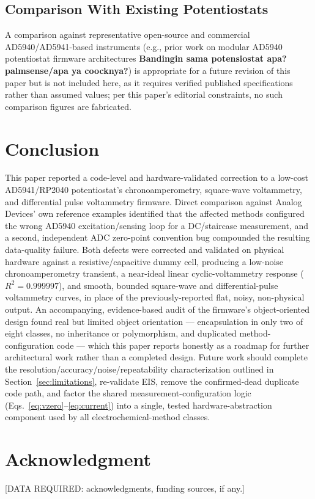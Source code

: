\documentclass[preprint,12pt]{elsarticle}
\begin{document}
\subsection{Comparison With Existing Potentiostats}
A comparison against representative open-source and commercial AD5940/AD5941-based instruments (e.g., prior work on modular AD5940 potentiostat firmware architectures \textbf{Bandingin sama potensiostat apa? palmsense/apa ya coocknya?}) is appropriate for a future revision of this paper but is not included here, as it requires verified published specifications rather than assumed values; per this paper's editorial constraints, no such comparison figures are fabricated.

\section{Conclusion}
This paper reported a code-level and hardware-validated correction to a low-cost AD5941/RP2040 potentiostat's chronoamperometry, square-wave voltammetry, and differential pulse voltammetry firmware. Direct comparison against Analog Devices' own reference examples identified that the affected methods configured the wrong AD5940 excitation/sensing loop for a DC/staircase measurement, and a second, independent ADC zero-point convention bug compounded the resulting data-quality failure. Both defects were corrected and validated on physical hardware against a resistive/capacitive dummy cell, producing a low-noise chronoamperometry transient, a near-ideal linear cyclic-voltammetry response ($R^2=0.999997$), and smooth, bounded square-wave and differential-pulse voltammetry curves, in place of the previously-reported flat, noisy, non-physical output. An accompanying, evidence-based audit of the firmware's object-oriented design found real but limited object orientation --- encapsulation in only two of eight classes, no inheritance or polymorphism, and duplicated method-configuration code --- which this paper reports honestly as a roadmap for further architectural work rather than a completed design. Future work should complete the resolution/accuracy/noise/repeatability characterization outlined in Section~\ref{sec:limitations}, re-validate EIS, remove the confirmed-dead duplicate code path, and factor the shared measurement-configuration logic (Eqs.~\eqref{eq:vzero}--\eqref{eq:current}) into a single, tested hardware-abstraction component used by all electrochemical-method classes.

\section*{Acknowledgment}
[DATA REQUIRED: acknowledgments, funding sources, if any.]
\end{document}
